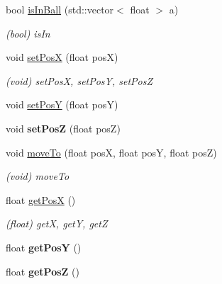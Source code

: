 {\bf }\par
\begin{DoxyCompactItemize}
\item 
bool \hyperlink{classcl__ball_a6936133de95a8022e064e1abca6e2916}{is\+In\+Ball} (std\+::vector$<$ float $>$ a)
\begin{DoxyCompactList}\small\item\em (bool) is\+In \end{DoxyCompactList}\end{DoxyCompactItemize}

{\bf }\par
\begin{DoxyCompactItemize}
\item 
void \hyperlink{classcl__figures_af1c498c43e5f302f9701f99d4407e6f0}{set\+Pos\+X} (float pos\+X)
\begin{DoxyCompactList}\small\item\em (void) set\+Pos\+X, set\+Pos\+Y, set\+Pos\+Z \end{DoxyCompactList}\item 
void \hyperlink{classcl__figures_ae07156aefb81f1a9b460e743f8f8c410}{set\+Pos\+Y} (float pos\+Y)
\item 
\hypertarget{classcl__figures_aaf722642edb1bd71e56e5005ad509182}{}void {\bfseries set\+Pos\+Z} (float pos\+Z)\label{classcl__figures_aaf722642edb1bd71e56e5005ad509182}

\end{DoxyCompactItemize}

{\bf }\par
\begin{DoxyCompactItemize}
\item 
void \hyperlink{classcl__figures_a00276ccac945306e2c65c0dcc7a7f558}{move\+To} (float pos\+X, float pos\+Y, float pos\+Z)
\begin{DoxyCompactList}\small\item\em (void) move\+To \end{DoxyCompactList}\end{DoxyCompactItemize}

{\bf }\par
\begin{DoxyCompactItemize}
\item 
float \hyperlink{classcl__figures_a4aff7e34bc5d177eb6332d1a40ea69ca}{get\+Pos\+X} ()
\begin{DoxyCompactList}\small\item\em (float) get\+X, get\+Y, get\+Z \end{DoxyCompactList}\item 
\hypertarget{classcl__figures_a8f5e37378abacd6075ab9df52abc109d}{}float {\bfseries get\+Pos\+Y} ()\label{classcl__figures_a8f5e37378abacd6075ab9df52abc109d}

\item 
\hypertarget{classcl__figures_a5e4861620e8f28d19d5ac29e71792b46}{}float {\bfseries get\+Pos\+Z} ()\label{classcl__figures_a5e4861620e8f28d19d5ac29e71792b46}

\end{DoxyCompactItemize}

